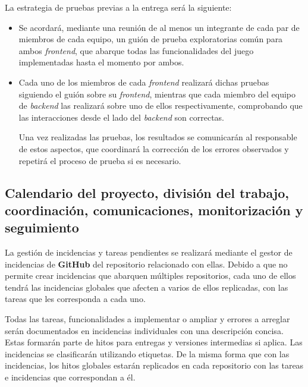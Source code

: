 \documentclass[11pt, a4paper, titlepage]{article}
\begin{document}
\begin{itemize}
    La estrategia de pruebas previas a la entrega será la siguiente:
    \begin{itemize}
        \item Se acordará, mediante una reunión de al menos un integrante de cada par de miembros de cada equipo, un guión de prueba exploratorias común para ambos \textit{frontend}, que abarque todas las funcionalidades del juego implementadas hasta el momento por ambos.
        
        \item Cada uno de los miembros de cada \textit{frontend} realizará dichas pruebas siguiendo el guión sobre su \textit{frontend}, mientras que cada miembro del equipo de \textit{backend} las realizará sobre uno de ellos respectivamente, comprobando que las interacciones desde el lado del \textit{backend} son correctas.
        
        Una vez realizadas las pruebas, los resultados se comunicarán al responsable de estos aspectos, que coordinará la corrección de los errores observados y repetirá el proceso de prueba si es necesario.
    \end{itemize}
\end{itemize}


\subsection{Calendario del proyecto, división del trabajo, coordinación, comunicaciones, monitorización y seguimiento}


\item La gestión de incidencias y tareas pendientes se realizará mediante el gestor de incidencias de \textbf{GitHub} del repositorio relacionado con ellas. Debido a que no permite crear incidencias que abarquen múltiples repositorios, cada uno de ellos tendrá las incidencias globales que afecten a varios de ellos replicadas, con las tareas que les corresponda a cada uno.
    
    \item Todas las tareas, funcionalidades a implementar o ampliar y errores a arreglar serán documentados en incidencias individuales con una descripción concisa. Estas formarán parte de hitos para entregas y versiones intermedias si aplica. Las incidencias se clasificarán utilizando etiquetas. De la misma forma que con las incidencias, los hitos globales estarán replicados en cada repositorio con las tareas e incidencias que correspondan a él.
    
\end{document}
